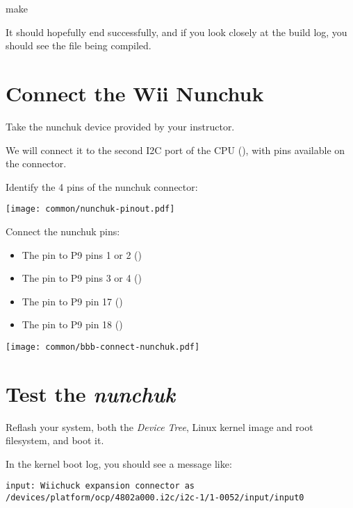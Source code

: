 \begin{bashinput}
make
\end{bashinput}

It should hopefully end successfully, and if you look closely at the
build log, you should see the file  being compiled.

\section{Connect the Wii Nunchuk}

Take the nunchuk device provided by your instructor.

We will connect it to the second I2C port of the CPU (),
with pins available on the  connector.

Identify the 4 pins of the nunchuk connector:

\begin{center}
\texttt{[image: common/nunchuk-pinout.pdf]}
\end{center}

Connect the nunchuk pins:
\begin{itemize}
\item The  pin to P9 pins 1 or 2 ()
\item The  pin to P9 pins 3 or 4 ()
\item The  pin to P9 pin 17 ()
\item The  pin to P9 pin 18 ()
\end{itemize}

\begin{center}
\texttt{[image: common/bbb-connect-nunchuk.pdf]}
\end{center}

\section{Test the {\em nunchuk}}

Reflash your system, both the {\em Device Tree}, Linux kernel image
and root filesystem, and boot it.

In the kernel boot log, you should see a message like:

\begin{verbatim}
input: Wiichuck expansion connector as /devices/platform/ocp/4802a000.i2c/i2c-1/1-0052/input/input0
\end{verbatim}

